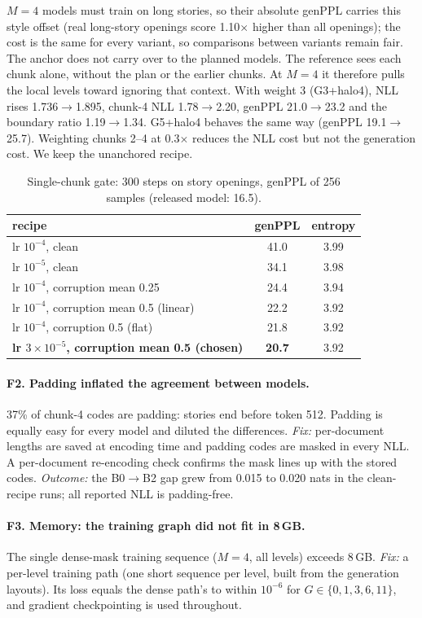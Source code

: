 $M{=}4$ models must train on long stories, so their absolute genPPL carries this style offset (real long-story
openings score 1.10$\times$ higher than all openings); the cost is the same for every variant, so comparisons
between variants remain fair. The anchor does not carry over to the planned models. The reference sees each chunk
alone, without the plan or the earlier chunks. At $M{=}4$ it therefore pulls the local levels toward ignoring that
context. With weight 3 (G3+halo4), NLL rises 1.736$\to$1.895, chunk-4 NLL 1.78$\to$2.20, genPPL 21.0$\to$23.2 and
the boundary ratio 1.19$\to$1.34. G5+halo4 behaves the same way (genPPL 19.1$\to$25.7). Weighting chunks 2--4 at
0.3$\times$ reduces the NLL cost but not the generation cost. We keep the unanchored recipe.

\begin{table}[h]
\centering
\caption{Single-chunk gate: 300 steps on story openings, genPPL of 256 samples (released model: 16.5).}
\label{tab:gate}
\begin{tabular}{lcc}
\toprule
recipe & genPPL & entropy \\
\midrule
lr $10^{-4}$, clean & 41.0 & 3.99 \\
lr $10^{-5}$, clean & 34.1 & 3.98 \\
lr $10^{-4}$, corruption mean 0.25 & 24.4 & 3.94 \\
lr $10^{-4}$, corruption mean 0.5 (linear) & 22.2 & 3.92 \\
lr $10^{-4}$, corruption 0.5 (flat) & 21.8 & 3.92 \\
\textbf{lr $3{\times}10^{-5}$, corruption mean 0.5 (chosen)} & \textbf{20.7} & 3.92 \\
\bottomrule
\end{tabular}
\end{table}

\paragraph{F2. Padding inflated the agreement between models.}
37\% of chunk-4 codes are padding: stories end before token 512. Padding is equally easy for every model and
diluted the differences. \emph{Fix:} per-document lengths are saved at encoding time and padding codes are
masked in every NLL. A per-document re-encoding check confirms the mask lines up with the stored codes.
\emph{Outcome:} the B0$\to$B2 gap grew from 0.015 to 0.020 nats in the clean-recipe runs; all reported NLL is
padding-free.

\paragraph{F3. Memory: the training graph did not fit in 8\,GB.}
The single dense-mask training sequence ($M{=}4$, all levels) exceeds 8\,GB. \emph{Fix:} a per-level training
path (one short sequence per level, built from the generation layouts). Its loss equals the dense path's to within
$10^{-6}$ for $G\in\{0,1,3,6,11\}$, and gradient checkpointing is used throughout.

